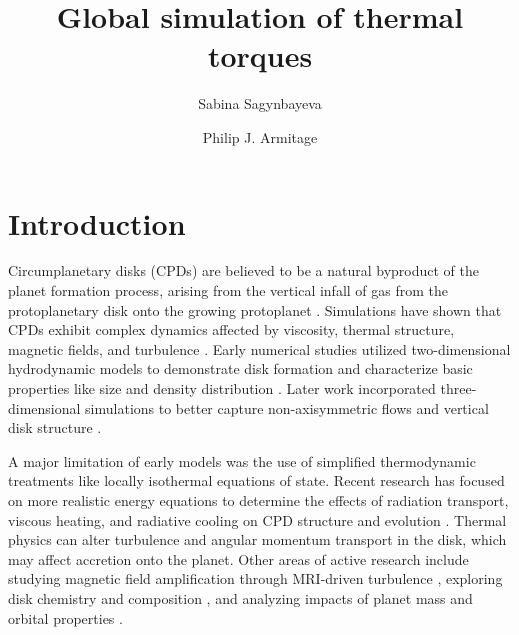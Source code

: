 \documentclass[twocolumn]{aastex631}
\begin{document}
\title{Global simulation of thermal torques}

\author[0000-0002-6650-3829]{Sabina Sagynbayeva}



\author[0000-0001-5032-1396]{Philip J. Armitage}


\begin{abstract}
   
\end{abstract}

\section{Introduction} 
\label{sec:intro}
Circumplanetary disks (CPDs) are believed to be a natural byproduct of the planet formation process, arising from the vertical infall of gas from the 
protoplanetary disk onto the growing protoplanet \citep{Ward2010}. Simulations have shown that CPDs exhibit complex dynamics affected by viscosity, 
thermal structure, magnetic fields, and turbulence \citep{Fujii2011,Gressel2013,Szul2014}. Early numerical studies utilized 
two-dimensional hydrodynamic models to demonstrate disk formation and characterize basic properties like size and density distribution \citep{Dangelo2003}. 
Later work incorporated three-dimensional simulations to better capture non-axisymmetric flows and vertical disk structure \citep{Machida2008}. 

A major limitation of early models was the use of simplified thermodynamic treatments like locally isothermal equations of state. Recent research has 
focused on more realistic energy equations to determine the effects of radiation transport, viscous heating, and radiative cooling on CPD structure and 
evolution \citep{Szul2016,Zhu2016}. Thermal physics can alter turbulence and angular momentum transport in the disk, which may affect accretion onto the planet. 
Other areas of active research include studying magnetic field amplification through MRI-driven turbulence \citep{Fujii2014}, exploring disk chemistry 
and composition \citep{Fujii2017}, and analyzing impacts of planet mass and orbital properties \citep{Szul2017a}.
\end{document}
